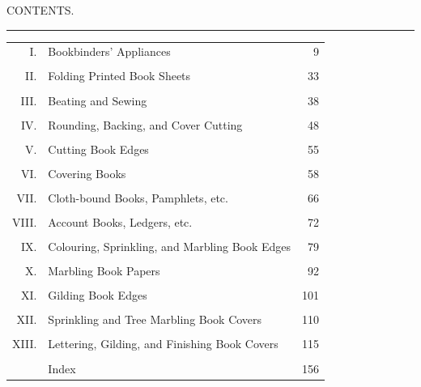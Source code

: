 \documentclass[twoside]{book}
\begin{document}
\vspace*{\fill}

\begin{center}\begin{Large}CONTENTS.\end{Large}\end{center}

\begin{center}\rule{0.5cm}{1pt.}\end{center}

\begin{tabular}{r l r}
    I. & Bookbinders' Appliances\dotfill & 9 \\
\\
   II. & Folding Printed Book Sheets\dotfill & 33 \\
\\
  III. & Beating and Sewing\dotfill & 38 \\
\\
  IV. & Rounding, Backing, and Cover Cutting\dotfill & 48 \\
\\
   V. & Cutting Book Edges\dotfill & 55 \\
\\
  VI. & Covering Books\dotfill &                                 58 \\
\\
 VII. & Cloth-bound Books, Pamphlets, etc.\dotfill &             66 \\
\\
VIII. & Account Books, Ledgers, etc.\dotfill &                   72 \\
\\
  IX. & Colouring, Sprinkling, and Marbling Book Edges\dotfill & 79 \\
\\
   X. & Marbling Book Papers\dotfill &                           92 \\
\\
  XI. & Gilding Book Edges\dotfill &                            101 \\
\\
 XII. & Sprinkling and Tree Marbling Book Covers\dotfill &      110 \\
\\
XIII. & Lettering, Gilding, and Finishing Book Covers\dotfill & 115 \\
\\
&      Index\dotfill                                          &156
\end{tabular}
\end{document}
